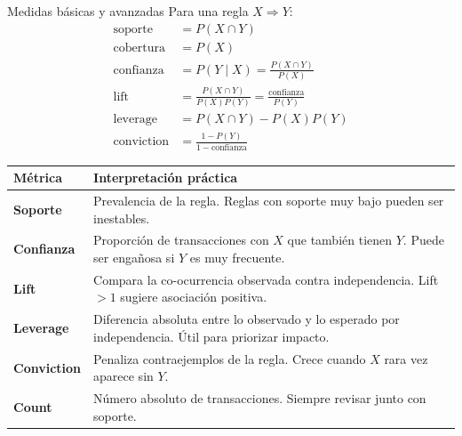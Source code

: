 \documentclass[10pt,aspectratio=169]{beamer}
\begin{document}
\begin{frame}{Medidas básicas y avanzadas}
Para una regla $X \Rightarrow Y$:
\begin{align*}
\text{soporte} &= P(X \cap Y) \\
\text{cobertura} &= P(X) \\
\text{confianza} &= P(Y \mid X)=\frac{P(X \cap Y)}{P(X)} \\
\text{lift} &= \frac{P(X \cap Y)}{P(X)P(Y)}=\frac{\text{confianza}}{P(Y)} \\
\text{leverage} &= P(X \cap Y)-P(X)P(Y) \\
\text{conviction} &= \frac{1-P(Y)}{1-\text{confianza}}
\end{align*}

\scriptsize
\begin{tabularx}{\textwidth}{>{\bfseries}lX}
\toprule
Métrica & Interpretación práctica \\
\midrule
Soporte & Prevalencia de la regla. Reglas con soporte muy bajo pueden ser inestables. \\
Confianza & Proporción de transacciones con $X$ que también tienen $Y$. Puede ser engañosa si $Y$ es muy frecuente. \\
Lift & Compara la co-ocurrencia observada contra independencia. Lift $>1$ sugiere asociación positiva. \\
Leverage & Diferencia absoluta entre lo observado y lo esperado por independencia. Útil para priorizar impacto. \\
Conviction & Penaliza contraejemplos de la regla. Crece cuando $X$ rara vez aparece sin $Y$. \\
Count & Número absoluto de transacciones. Siempre revisar junto con soporte. \\
\bottomrule
\end{tabularx}
\end{frame}

%
%
\end{document}
